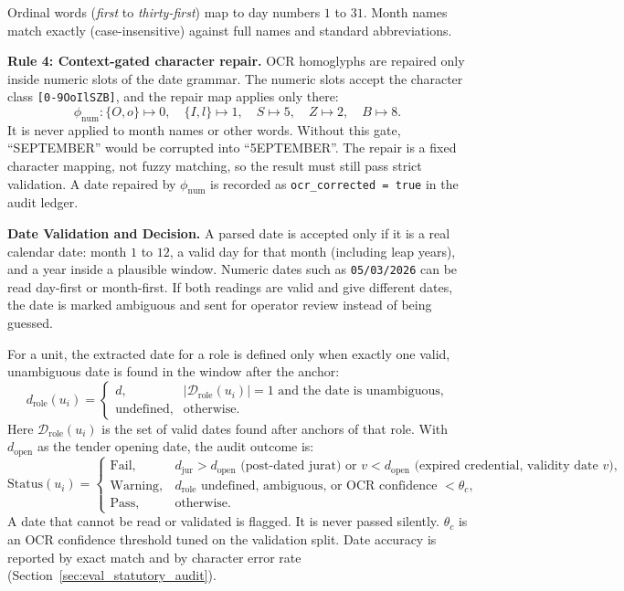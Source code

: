 Ordinal words (\emph{first} to \emph{thirty-first}) map to day numbers $1$ to $31$. Month names match exactly (case-insensitive) against full names and standard abbreviations.

\textbf{Rule 4: Context-gated character repair.} OCR homoglyphs are repaired only inside numeric slots of the date grammar. The numeric slots accept the character class \texttt{[0-9OoIlSZB]}, and the repair map applies only there:
\begin{equation}
\label{eq:gated_repair}
\phi_{\mathrm{num}} : \{O, o\} \mapsto 0, \quad \{I, l\} \mapsto 1, \quad S \mapsto 5, \quad Z \mapsto 2, \quad B \mapsto 8.
\end{equation}
It is never applied to month names or other words. Without this gate, ``SEPTEMBER'' would be corrupted into ``5EPTEMBER''. The repair is a fixed character mapping, not fuzzy matching, so the result must still pass strict validation. A date repaired by $\phi_{\mathrm{num}}$ is recorded as \texttt{ocr\_corrected = true} in the audit ledger.

\textbf{Date Validation and Decision.} A parsed date is accepted only if it is a real calendar date: month $1$ to $12$, a valid day for that month (including leap years), and a year inside a plausible window. Numeric dates such as \texttt{05/03/2026} can be read day-first or month-first. If both readings are valid and give different dates, the date is marked ambiguous and sent for operator review instead of being guessed.

For a unit, the extracted date for a role is defined only when exactly one valid, unambiguous date is found in the window after the anchor:
\begin{equation}
\label{eq:extracted_date}
d_{\mathrm{role}}(u_i) = \begin{cases}
d, & |\mathcal{D}_{\mathrm{role}}(u_i)| = 1 \text{ and the date is unambiguous,} \\
\text{undefined}, & \text{otherwise.}
\end{cases}
\end{equation}
Here $\mathcal{D}_{\mathrm{role}}(u_i)$ is the set of valid dates found after anchors of that role. With $d_{\mathrm{open}}$ as the tender opening date, the audit outcome is:
\begin{equation}
\label{eq:audit_outcome}
\mathrm{Status}(u_i) = \begin{cases}
\mathrm{Fail}, & d_{\mathrm{jur}} > d_{\mathrm{open}} \text{ (post-dated jurat) or } v < d_{\mathrm{open}} \text{ (expired credential, validity date } v\text{)}, \\
\mathrm{Warning}, & d_{\mathrm{role}} \text{ undefined, ambiguous, or OCR confidence } < \theta_c, \\
\mathrm{Pass}, & \text{otherwise.}
\end{cases}
\end{equation}
A date that cannot be read or validated is flagged. It is never passed silently. $\theta_c$ is an OCR confidence threshold tuned on the validation split. Date accuracy is reported by exact match and by character error rate (Section~\ref{sec:eval_statutory_audit}).

